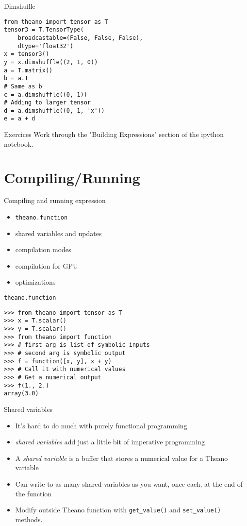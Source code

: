 \documentclass[utf8x,hyperref={pdfpagelabels=false}]{beamer}
\newcommand{\code}[1]{\lstinline[emph={[2]}]|#1|}
\begin{document}
\begin{frame}[fragile]{Dimshuffle}
\begin{lstlisting}
from theano import tensor as T
tensor3 = T.TensorType(
    broadcastable=(False, False, False),
    dtype='float32')
x = tensor3()
y = x.dimshuffle((2, 1, 0))
a = T.matrix()
b = a.T
# Same as b
c = a.dimshuffle((0, 1))
# Adding to larger tensor
d = a.dimshuffle((0, 1, 'x'))
e = a + d
\end{lstlisting}
\end{frame}

\begin{frame}{Exercices}
Work through the "Building Expressions" section of the ipython notebook.
\end{frame}

\section{Compiling/Running}
\begin{frame}{Compiling and running expression}
  \begin{itemize}
  \item \code{theano.function}
  \item shared variables and updates
  \item compilation modes
  \item compilation for GPU
  \item optimizations
  \end{itemize}
\end{frame}

\begin{frame}[fragile]{\code{theano.function}}

\begin{lstlisting}
>>> from theano import tensor as T
>>> x = T.scalar()
>>> y = T.scalar()
>>> from theano import function
>>> # first arg is list of symbolic inputs
>>> # second arg is symbolic output
>>> f = function([x, y], x + y)
>>> # Call it with numerical values
>>> # Get a numerical output
>>> f(1., 2.)
array(3.0)
\end{lstlisting}
\end{frame}

\begin{frame}{Shared variables}
  \begin{itemize}
  \item It’s hard to do much with purely functional programming
  \item \emph{shared variables} add just a little bit of imperative programming
  \item A \emph{shared variable} is a buffer that stores a numerical value for a Theano variable
  \item Can write to as many shared variables as you want, once each, at the end of the function
  \item  Modify outside Theano function with \code{get_value()} and \code{set_value()} methods.
  \end{itemize}
\end{frame}
\end{document}
